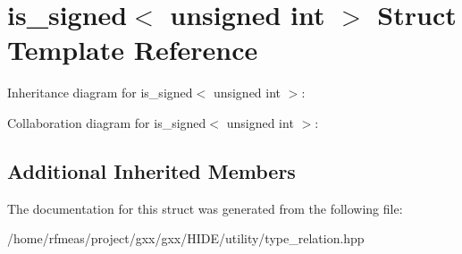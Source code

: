 \hypertarget{structis__signed_3_01unsigned_01int_01_4}{}\section{is\+\_\+signed$<$ unsigned int $>$ Struct Template Reference}
\label{structis__signed_3_01unsigned_01int_01_4}


Inheritance diagram for is\+\_\+signed$<$ unsigned int $>$\+:


Collaboration diagram for is\+\_\+signed$<$ unsigned int $>$\+:
\subsection*{Additional Inherited Members}


The documentation for this struct was generated from the following file\+:\begin{DoxyCompactItemize}
\item 
/home/rfmeas/project/gxx/gxx/\+H\+I\+D\+E/utility/type\+\_\+relation.\+hpp\end{DoxyCompactItemize}
